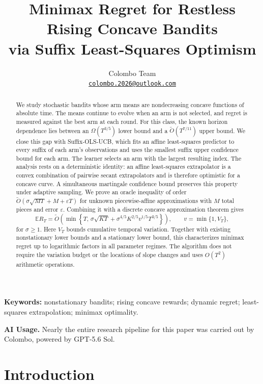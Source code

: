 \documentclass[11pt]{article}
\title{\vspace{-1.4em}Minimax Regret for Restless Rising Concave Bandits\\[0.2em]
\large via Suffix Least-Squares Optimism}
\author{Colombo Team\\[0.2em]\normalsize\href{mailto:colombo.2026@outlook.com}{\texttt{colombo.2026@outlook.com}}}
\date{}
\theoremstyle{remark}
\newcommand{\E}{\mathbb E}
\begin{document}
\maketitle
\begin{abstract}
We study stochastic bandits whose arm means are nondecreasing concave functions of absolute time. The means continue to evolve when an arm is not selected, and regret is measured against the best arm at each round. For this class, the known horizon dependence lies between an $\Omega(T^{3/5})$ lower bound and a $\widetilde O(T^{7/11})$ upper bound. We close this gap with Suffix-OLS-UCB, which fits an affine least-squares predictor to every suffix of each arm's observations and uses the smallest suffix upper confidence bound for each arm. The learner selects an arm with the largest resulting index. The analysis rests on a deterministic identity: an affine least-squares extrapolator is a convex combination of pairwise secant extrapolators and is therefore optimistic for a concave curve. A simultaneous martingale confidence bound preserves this property under adaptive sampling. We prove an oracle inequality of order $\widetilde O(\sigma\sqrt{MT}+M+\varepsilon T)$ for unknown piecewise-affine approximations with $M$ total pieces and error $\varepsilon$. Combining it with a discrete concave approximation theorem gives
\[
\E R_T=\widetilde O\!\left(\min\left\{T,\,
\sigma\sqrt{KT}+\sigma^{4/5}K^{2/5}v^{1/5}T^{3/5}\right\}\right),
\qquad v=\min\{1,V_T\},
\]
for $\sigma\ge1$. Here $V_T$ bounds cumulative temporal variation. Together with existing nonstationary lower bounds and a stationary lower bound, this characterizes minimax regret up to logarithmic factors in all parameter regimes. The algorithm does not require the variation budget or the locations of slope changes and uses $O(T^2)$ arithmetic operations.
\end{abstract}
\medskip
\noindent\textbf{Keywords:} nonstationary bandits; rising concave rewards; dynamic regret; least-squares extrapolation; minimax optimality.\par
\medskip
\begin{samepage}
\noindent\textbf{AI Usage.}
Nearly the entire research pipeline for this paper was carried out by
Colombo, powered by GPT-5.6 Sol. 
\par
\end{samepage}
\medskip

\section{Introduction}\label{sec:intro}
\end{document}
